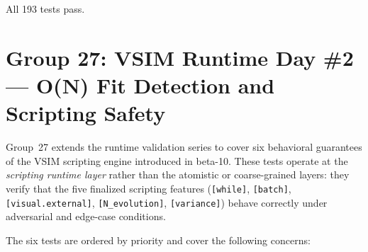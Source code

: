 \documentclass[11pt]{article}
\begin{document}
All 193 tests pass.

\section{Group 27: VSIM Runtime Day \#2 --- O(N) Fit Detection and Scripting Safety}
\label{sec:group27}

Group~27 extends the runtime validation series to cover six behavioral
guarantees of the VSIM scripting engine introduced in beta-10.  These tests
operate at the \emph{scripting runtime layer} rather than the atomistic or
coarse-grained layers: they verify that the five finalized scripting features
(\texttt{[while]}, \texttt{[batch]}, \texttt{[visual.external]},
\texttt{[N\_evolution]}, \texttt{[variance]}) behave correctly under
adversarial and edge-case conditions.

The six tests are ordered by priority and cover the following concerns:
\end{document}
